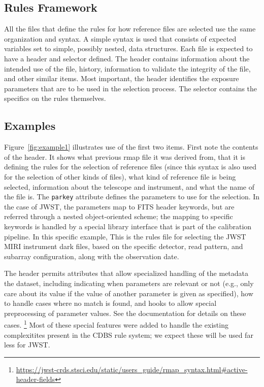 \documentclass[final,authoryear,5p,times,twocolumn]{elsarticle}
\begin{document}
\subsection{Rules Framework}

All the files that define the rules for how reference files are selected
use the same organization and syntax.
A simple syntax is used that consists of expected variables set to simple, 
possibly nested, data structures. Each file is expected to have a header 
and selector defined. The header contains information about the intended 
use of the file, history, information to validate the integrity of the file,
and other similar items. Most important, the header identifies the exposure
parameters that are to be used in the selection process. The selector 
contains the specifics on the rules themselves.

\subsection{Examples}

Figure~\ref{fig:example1} illustrates use of the first two items. First note the contents
of the header. It shows what previous rmap file it was derived from, that it is defining
the rules for the selection of reference files (since this syntax is also used for
the selection of other kinds of files), what kind of reference file is being selected, information about the telescope and instrument, and what the name of the file is. 
The {\tt parkey} attribute defines the parameters to use for the selection. In the
case of JWST, the parameters map to FITS header keywords, but are referred through a
nested object-oriented scheme; the mapping to specific keywords is handled by a special
library interface that is part of the calibration pipeline. In this specific example,
This is the rules file for selecting the JWST MIRI instrument dark files, based on 
the specific detector, read pattern, and subarray configuration, along with the 
observation date.

The header permits attributes that allow specialized handling of the metadata 
the dataset, including indicating when parameters are relevant or not (e.g., only 
care about its value if the value of another parameter is given as specified), 
how to handle cases where no match is found, and hooks to allow special preprocessing
of parameter values. See the documentation for details on these cases.
\footnote{\url{https://jwst-crds.stsci.edu/static/users\_guide/rmap_syntax.html\#active-header-fields}}
Most of these special features were added to handle the existing complexitites present in the CDBS rule system; we expect these will be used far less for JWST.
\end{document}
